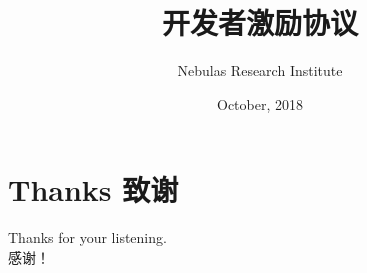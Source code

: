 \documentclass[10pt, mathserif]{beamer} %
\begin{document}
\title[abbreviation]{开发者激励协议}
\author{ Nebulas Research Institute}

\date{October, 2018}


\begin{frame}
    \titlepage	%
\end{frame}


%





\section{Thanks 致谢}
\begin{frame}
	Thanks for your listening. \\
	感谢！
\end{frame}
\end{document}
